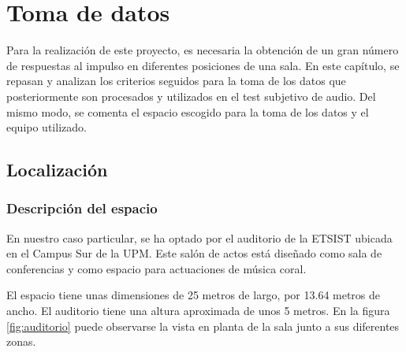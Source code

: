 \documentclass[11pt,a4paper,twoside]{book}
\author{Víctor de Tejada Molera}
\begin{document}
\chapter{Toma de datos}
	Para la realización de este proyecto, es necesaria la obtención de un gran número de respuestas al impulso en diferentes posiciones de una sala. En este capítulo, se repasan y analizan los criterios seguidos para la toma de los datos que posteriormente son procesados y utilizados en el test subjetivo de audio. Del mismo modo, se comenta el espacio escogido para la toma de los datos y el equipo utilizado.

	\section{Localización}

		\subsection{Descripción del espacio}

 			En nuestro caso particular, se ha optado por el auditorio de la ETSIST ubicada en el Campus Sur de la UPM. Este salón de actos está diseñado como sala de conferencias y como espacio para actuaciones de música coral. 
 
 			El espacio tiene unas dimensiones de 25 metros de largo, por 13.64 metros de ancho. El auditorio tiene una altura aproximada de unos 5 metros. En la figura \ref{fig:auditorio} puede observarse la vista en planta de la sala junto a sus diferentes zonas.
 			
\end{document}
